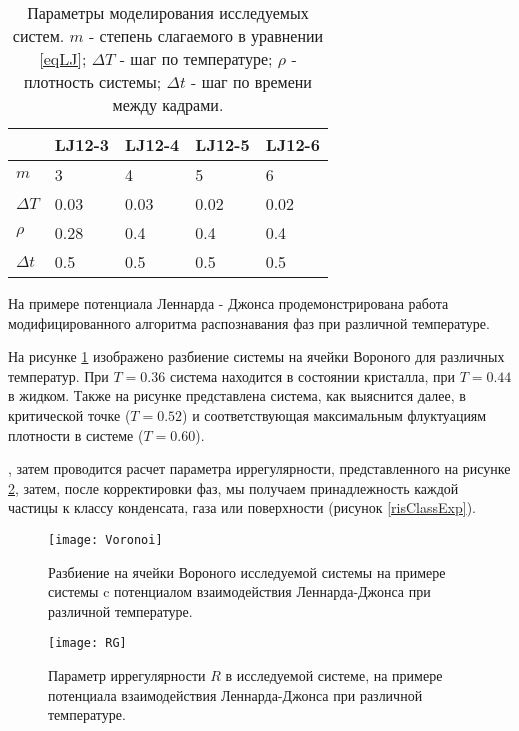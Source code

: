 \begin{table}[h]
\begin{center}
\begin{tabular}{| l | l | l | l | l |}
\hline
    & LJ12-3 & LJ12-4 & LJ12-5 & LJ12-6 \\ \hline
$m$   &    3    &     4   &    5    &    6    \\ \hline
$\Delta T$ & 0.03 & 0.03 & 0.02 & 0.02 \\ \hline
$\rho$ & 0.28  &  0.4  &  0.4  &  0.4  \\ \hline
$\Delta t$ & 0.5 & 0.5 & 0.5 & 0.5 \\ \hline
\end{tabular}
\end{center}
\caption{Параметры моделирования исследуемых систем. $m$ - степень слагаемого в уравнении \ref{eqLJ}; $\Delta T$ - шаг по температуре;  $\rho$ - плотность системы; $\Delta t$ - шаг по времени между кадрами.}
\label{tablParam}
\end{table}

На примере потенциала Леннарда - Джонса продемонстрирована работа модифицированного алгоритма распознавания фаз при различной температуре.

На рисунке \ref{risvoronoiExp} изображено разбиение системы на ячейки Вороного для различных температур. При $T = 0.36$ система находится в состоянии кристалла, при $T = 0.44$ в жидком. Также на рисунке представлена система, как выяснится далее, в критической точке ($T = 0.52$) и соответствующая максимальным флуктуациям плотности в системе ($T = 0.60$).

, затем проводится расчет параметра иррегулярности, представленного на рисунке \ref{risIregExp}, затем, после корректировки фаз, мы получаем принадлежность каждой частицы к классу конденсата, газа или поверхности (рисунок \ref{risClassExp}).


\begin{figure}[h]
\begin{center}
\texttt{[image: Voronoi]}
\caption{Разбиение на ячейки Вороного исследуемой системы на примере системы c потенциалом взаимодействия Леннарда-Джонса при различной температуре.}
\label{risvoronoiExp}
\end{center}
\end{figure}



\begin{figure}[h]
\begin{center}
\texttt{[image: RG]}
\caption{Параметр иррегулярности $R$ в исследуемой системе, на примере потенциала взаимодействия Леннарда-Джонса при различной температуре.}
\label{risIregExp}
\end{center}
\end{figure}



